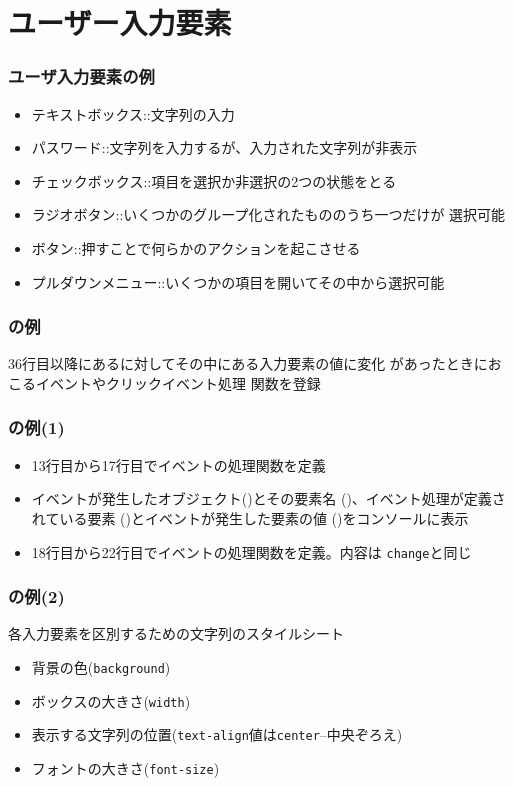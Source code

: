 \section{ユーザー入力要素}
\begin{frame}[containsverbatim]
 \frametitle{ユーザ入力要素の例}
    \begin{itemize}
     \item テキストボックス::文字列の入力
     \item パスワード::文字列を入力するが、入力された文字列が非表示
     \item チェックボックス::項目を選択か非選択の2つの状態をとる
     \item ラジオボタン::いくつかのグループ化されたもののうち一つだけが
           選択可能
     \item ボタン::押すことで何らかのアクションを起こさせる
     \item プルダウンメニュー::いくつかの項目を開いてその中から選択可能
    \end{itemize}
\end{frame}
\begin{frame}[containsverbatim]
 \frametitle{の例}\small
 36行目以降にあるに対してその中にある入力要素の値に変化
        があったときにおこるイベントやクリックイベント処理
        関数を登録
\end{frame}
\begin{frame}[containsverbatim]
 \frametitle{の例(1)}\small
 \begin{itemize}
  \item 13行目から17行目でイベントの処理関数を定義
  \item イベントが発生したオブジェクト()とその要素名
        ()、イベント処理が定義されている要素
        ()とイベントが発生した要素の値
        ()をコンソールに表示
  \item 18行目から22行目でイベントの処理関数を定義。内容は
        \texttt{change}と同じ
 \end{itemize}
\end{frame}
\begin{frame}[containsverbatim]
 \frametitle{の例(2)}\small
 各入力要素を区別するための文字列のスタイルシート
 \begin{itemize}
  \item 背景の色(\texttt{background})
  \item ボックスの大きさ(\texttt{width})
  \item 表示する文字列の位置(\texttt{text-align}値は\texttt{center}--中央ぞろえ)
  \item フォントの大きさ(\texttt{font-size})
 \end{itemize}
\end{frame}
